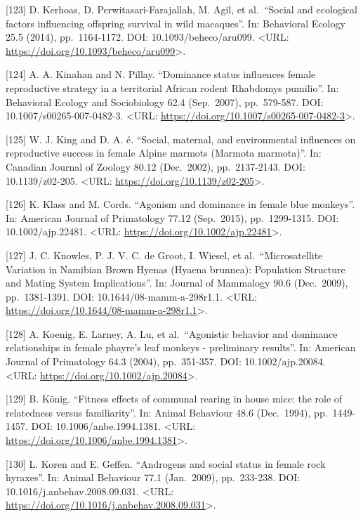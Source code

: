 \documentclass[
]{article}
\begin{document}
{[}123{]} D. Kerhoas, D. Perwitasari-Farajallah, M. Agil, et
al.~``Social and ecological factors influencing offspring survival in
wild macaques''. In: Behavioral Ecology 25.5 (2014), pp.~1164-1172. DOI:
10.1093/beheco/aru099. \textless URL:
\url{https://doi.org/10.1093/beheco/aru099}\textgreater.

{[}124{]} A. A. Kinahan and N. Pillay. ``Dominance status influences
female reproductive strategy in a territorial African rodent Rhabdomys
pumilio''. In: Behavioral Ecology and Sociobiology 62.4 (Sep.~2007),
pp.~579-587. DOI: 10.1007/s00265-007-0482-3. \textless URL:
\url{https://doi.org/10.1007/s00265-007-0482-3}\textgreater.

{[}125{]} W. J. King and D. A. é. ``Social, maternal, and environmental
influences on reproductive success in female Alpine marmots (Marmota
marmota)''. In: Canadian Journal of Zoology 80.12 (Dec.~2002),
pp.~2137-2143. DOI: 10.1139/z02-205. \textless URL:
\url{https://doi.org/10.1139/z02-205}\textgreater.

{[}126{]} K. Klass and M. Cords. ``Agonism and dominance in female blue
monkeys''. In: American Journal of Primatology 77.12 (Sep.~2015),
pp.~1299-1315. DOI: 10.1002/ajp.22481. \textless URL:
\url{https://doi.org/10.1002/ajp.22481}\textgreater.

{[}127{]} J. C. Knowles, P. J. V. C. de Groot, I. Wiesel, et
al.~``Microsatellite Variation in Namibian Brown Hyenas (Hyaena
brunnea): Population Structure and Mating System Implications''. In:
Journal of Mammalogy 90.6 (Dec.~2009), pp.~1381-1391. DOI:
10.1644/08-mamm-a-298r1.1. \textless URL:
\url{https://doi.org/10.1644/08-mamm-a-298r1.1}\textgreater.

{[}128{]} A. Koenig, E. Larney, A. Lu, et al.~``Agonistic behavior and
dominance relationships in female phayre's leaf monkeys - preliminary
results''. In: American Journal of Primatology 64.3 (2004), pp.~351-357.
DOI: 10.1002/ajp.20084. \textless URL:
\url{https://doi.org/10.1002/ajp.20084}\textgreater.

{[}129{]} B. König. ``Fitness effects of communal rearing in house mice:
the role of relatedness versus familiarity''. In: Animal Behaviour 48.6
(Dec.~1994), pp.~1449-1457. DOI: 10.1006/anbe.1994.1381. \textless URL:
\url{https://doi.org/10.1006/anbe.1994.1381}\textgreater.

{[}130{]} L. Koren and E. Geffen. ``Androgens and social status in
female rock hyraxes''. In: Animal Behaviour 77.1 (Jan.~2009),
pp.~233-238. DOI: 10.1016/j.anbehav.2008.09.031. \textless URL:
\url{https://doi.org/10.1016/j.anbehav.2008.09.031}\textgreater.
\end{document}
